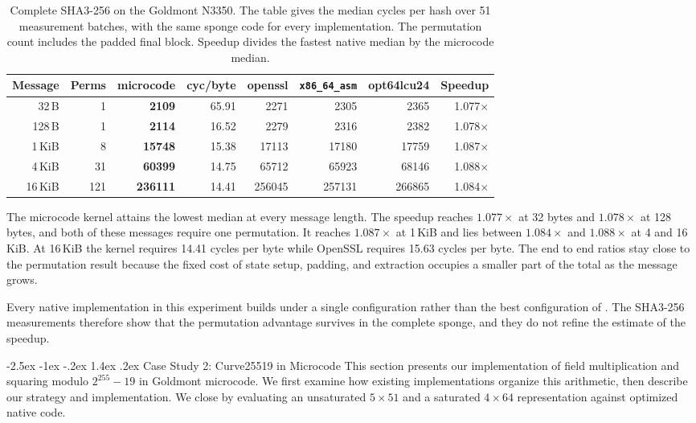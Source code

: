 \documentclass[journal=tches,submission]{iacrtrans}
\makeatletter
\renewcommand\section{\@startsection{section}{1}{\z@}%
      {-2.5ex \@plus -1ex \@minus -.2ex}%
      {1.4ex \@plus .2ex}%
      {\normalfont\Large\bfseries\SS@sectfont}}
\makeatother
\begin{document}
\begin{table}[!ht]
\centering
\caption{Complete SHA3-256 on the Goldmont N3350.
The table gives the median cycles per hash over 51 measurement batches, with the same sponge code for every implementation.
The permutation count includes the padded final block.
Speedup divides the fastest native median by the microcode median.}
\label{tab:results-sha3}
\footnotesize
\setlength{\tabcolsep}{4pt}
\begin{tabular}{@{}rrrrrrrr@{}}
\toprule
Message & Perms & \textbf{microcode} & cyc/byte & openssl & \texttt{x86\_64\_asm} & opt64lcu24 & Speedup \\
\midrule
32\,B      & 1   & \textbf{2109}   & 65.91 & 2271   & 2305   & 2365   & 1.077$\times$ \\
128\,B     & 1   & \textbf{2114}   & 16.52 & 2279   & 2316   & 2382   & 1.078$\times$ \\
1\,KiB     & 8   & \textbf{15748}  & 15.38 & 17113  & 17180  & 17759  & 1.087$\times$ \\
4\,KiB     & 31  & \textbf{60399}  & 14.75 & 65712  & 65923  & 68146  & 1.088$\times$ \\
16\,KiB    & 121 & \textbf{236111} & 14.41 & 256045 & 257131 & 266865 & 1.084$\times$ \\
\bottomrule
\end{tabular}
\end{table}

The microcode kernel attains the lowest median at every message length.
The speedup reaches $1.077\times$ at 32 bytes and $1.078\times$ at 128 bytes, and both of these messages require one permutation.
It reaches $1.087\times$ at 1\,KiB and lies between $1.084\times$ and $1.088\times$ at 4 and 16\,KiB.
At 16\,KiB the kernel requires 14.41 cycles per byte while OpenSSL requires 15.63 cycles per byte.
The end to end ratios stay close to the permutation result because the fixed cost of state setup, padding, and extraction occupies a smaller part of the total as the message grows.

Every native implementation in this experiment builds under a single configuration rather than the best configuration of .
The SHA3-256 measurements therefore show that the permutation advantage survives in the complete sponge, and they do not refine the estimate of the speedup.

\section{Case Study 2: Curve25519 in Microcode}
\label{sec:curve25519}
This section presents our implementation of field multiplication and squaring modulo $2^{255}-19$ in Goldmont microcode.
We first examine how existing implementations organize this arithmetic, then describe our strategy and implementation.
We close by evaluating an unsaturated $5\times51$ and a saturated $4\times64$ representation against optimized native code.
\end{document}
